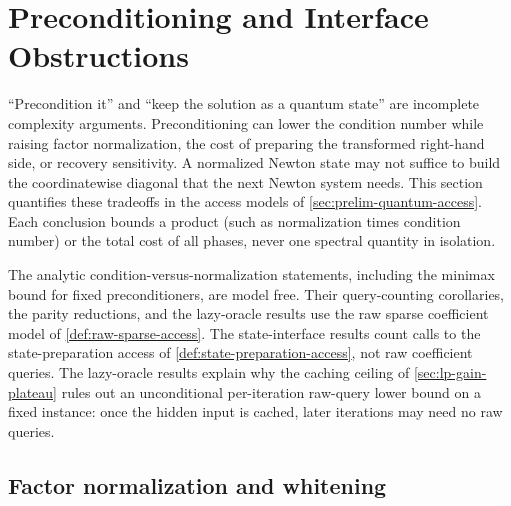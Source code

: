 \section{Preconditioning and Interface Obstructions}
\label{sec:preconditioning}

``Precondition it'' and ``keep the solution as a quantum state'' are
incomplete complexity arguments.  Preconditioning can lower the condition
number while raising factor normalization, the cost of preparing the
transformed right-hand side, or recovery sensitivity.  A normalized Newton state may not suffice to build the
coordinatewise diagonal that the next Newton system needs.  This section
quantifies these tradeoffs in the access models of
\cref{sec:prelim-quantum-access}.  Each conclusion bounds a product (such as
normalization times condition number) or the total cost of all phases, never
one spectral quantity in isolation.

The analytic condition-versus-normalization statements, including the
minimax bound for fixed preconditioners, are model free.  Their
query-counting corollaries, the parity reductions, and the lazy-oracle
results use the raw sparse coefficient model of \cref{def:raw-sparse-access}.
The state-interface results count calls to the state-preparation access of
\cref{def:state-preparation-access}, not raw coefficient queries.  The
lazy-oracle results explain why the caching ceiling of
\cref{sec:lp-gain-plateau} rules out an unconditional per-iteration
raw-query lower bound on a fixed instance: once the hidden input is cached,
later iterations may need no raw queries.

\subsection{Factor normalization and whitening}
\label{sec:preconditioning-whitening}

